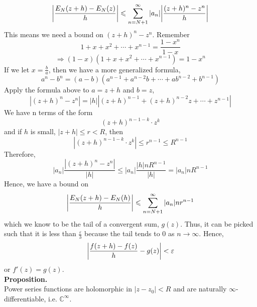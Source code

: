 \documentclass[11pt]{article}
\DeclarePairedDelimiter\abs{\lvert}{\rvert}
\begin{document}
$$\abs*{\frac{E_N(z + h) - E_N(z)}{h}} \leqslant \sum_{n = N + 1}^{\infty} |a_n|\abs*{\frac{(z + h)^n - z^n}{h}} $$
This means we need a bound on $(z + h)^n - z^n$. Remember 
$$1 + x + x^2 + \cdots + x^{n - 1} = \frac{1 - x^n}{1 - x}$$
$$\Rightarrow (1 - x) (1 + x + x^2 + \cdots + x^{n - 1}) = 1 - x^n$$
If we let $x = \frac{b}{a}$, then we have a more generalized formula, 
$$a^n - b^n = (a - b)(a^{n - 1} + a^{n - 2}b + \cdots + ab^{n - 2} + b^{n - 1})$$
Apply the formula above to $a = z + h$ and $b = z$, 
$$|(z + h)^n - z^n| = |h||(z+h)^{n - 1} + (z+h)^{n - 2}z + \cdots + z^{n - 1}|$$
We have n terms of the form 
$$(z + h)^{n - 1 - k} \cdot z^k$$
and if $h$ is small, $|z+h| \leqslant r < R$, then 
$$|(z + h)^{n - 1 - k} \cdot z^k| \leqslant r^{n -1} \leqslant R^{n - 1}$$
Therefore, 
$$ |a_n|\frac{|(z+h)^n - z^n|}{|h|} \leqslant |a_n|\frac{|h|nR^{n - 1}}{|h|} = |a_n|nR^{n -1} $$
Hence, we have a bound on
$$\abs*{\frac{E_N(z+h) - E_N(h)}{h}} \leqslant \sum_{n = N + 1}^{\infty} |a_n|nr^{n - 1}$$
which we know to be the tail of a convergent sum, $g(z)$. Thus, it can be picked such that it is less than $\frac{\varepsilon}{3}$ because the tail tends to 0 as $n \to \infty$. Hence, 
$$\abs*{\frac{f(z+h)-f(z)}{h} - g(z)} < \varepsilon$$
or $f'(z) = g(z)$. \\
\newline
\textbf{Proposition.} \\
Power series functions are holomorphic in $|z - z_0| < R$ and are naturally $\infty$-differentiable, i.e. $\mathbb{C}^\infty$.

\newpage
\end{document}
